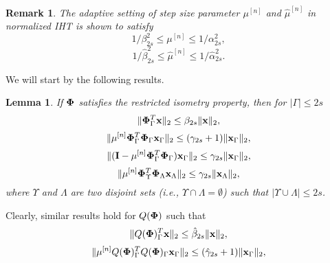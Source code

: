 \documentclass[article]{imsart}
\newtheorem{lemma}{Lemma}
\newtheorem{remark}{Remark}
\begin{document}
\begin{remark}
The adaptive setting of step size parameter $\mu^{[n]}$ and $\hat{\mu}^{[n]}$ in normalized IHT is shown to satisfy
\begin{equation}\label{bounds_mu}
   1/\beta^2_{2s} \leq \mu^{[n]} \leq 1/\alpha^2_{2s},
\end{equation}
\begin{equation}\label{bounds_muhat}
   1/\hat{\beta}^2_{2s} \leq \hat{\mu}^{[n]} \leq 1/\hat{\alpha}^2_{2s}.
\end{equation}
\end{remark}


We will start by the following results.
\begin{lemma}\label{lemmas_on_phi}
{\rm{\cite{blumensath2010niht}}}
If ${\bf {\bf \Phi}}$ satisfies the restricted isometry property, then for $|\Gamma|\leq 2s$
\begin{equation}\label{mu*phi}
    \| {\bf {\bf \Phi}}_{\Gamma}^T{\bf x}\|_2 \leq \beta_{2s}\|{\bf x} \|_2,
\end{equation}
\begin{equation}\label{mu*phi*phi}
    \| \mu^{[n]}{\bf {\bf \Phi}}_{\Gamma}^T{\bf {\bf \Phi}}_{\Gamma}{\bf x}_{\Gamma}\|_2 \leq (\gamma_{2s}+1)\|{\bf x}_{\Gamma} \|_2,
\end{equation}
\begin{equation}\label{1-mu*phi*phi}
    \| ( {\bf I}- \mu^{[n]}{\bf {\bf \Phi}}_{\Gamma}^T{\bf {\bf \Phi}}_{\Gamma}){\bf x}_{\Gamma}\|_2 \leq \gamma_{2s}\|{\bf x}_{\Gamma} \|_2,
\end{equation}
\begin{equation}\label{mu*phi1*phi2}
     \| \mu^{[n]}{\bf {\bf \Phi}}_{\Upsilon}^T{\bf {\bf \Phi}}_{\Lambda}{\bf x}_{\Lambda}\|_2 \leq \gamma_{2s}\|{\bf x}_{\Lambda} \|_2,
\end{equation}
where $\Upsilon$ and $\Lambda$ are two disjoint sets (i.e., $\Upsilon \cap \Lambda = \emptyset$) such that $|\Upsilon \cup \Lambda| \leq 2s$. 
\end{lemma}
Clearly, similar results hold for $Q(\boldsymbol{{\bf \Phi}})$ such that
\begin{equation}\label{q_mu*phi}
     \|Q({\bf {\bf \Phi}})_{\Gamma}^T{\bf x}\|_2 \leq \hat{\beta}_{2s}\|{\bf x} \|_2,
\end{equation}
\begin{equation}\label{q_mu*phi*phi}
    \| \mu^{[n]}Q({\bf {\bf \Phi}})_{\Gamma}^TQ({\bf {\bf \Phi}})_{\Gamma}{\bf x}_{\Gamma}\|_2 \leq (\hat{\gamma}_{2s}+1)\|{\bf x}_{\Gamma} \|_2,
\end{equation}
\end{document}
